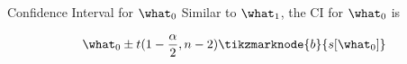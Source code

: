 \documentclass[aspectratio=169,xcolor=dvipsnames,svgnames,x11names,fleqn]{beamer}
\begin{document}
    \begin{frame}{Confidence Interval for $\what_0$}
    Similar to $\what_1$, the CI for $\what_0$ is
    \begin{gradblock}{}
    {\Huge
    \begin{equation}
    {
        \what_0 \pm t(1- \frac{\alpha}{2}, n - 2)\tikzmarknode{b}{s[\what_0 ]}
    }
    \end{equation}
    }
    \end{gradblock}
    \end{frame}
    
    
    
    

    
    
    
\end{document}
